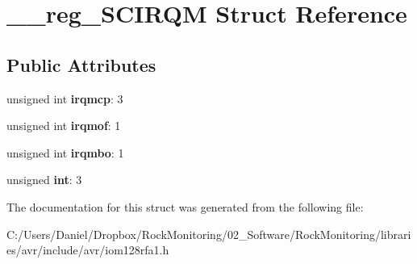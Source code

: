 \hypertarget{struct____reg___s_c_i_r_q_m}{}\section{\+\_\+\+\_\+reg\+\_\+\+S\+C\+I\+R\+QM Struct Reference}
\label{struct____reg___s_c_i_r_q_m}
\subsection*{Public Attributes}
\begin{DoxyCompactItemize}
\item 
unsigned int {\bfseries irqmcp}\+: 3\hypertarget{struct____reg___s_c_i_r_q_m_aca69c7a30afd0edab140d50f1ce9523c}{}\label{struct____reg___s_c_i_r_q_m_aca69c7a30afd0edab140d50f1ce9523c}

\item 
unsigned int {\bfseries irqmof}\+: 1\hypertarget{struct____reg___s_c_i_r_q_m_a069ed6155131d29311fc6e8fdd8c65c2}{}\label{struct____reg___s_c_i_r_q_m_a069ed6155131d29311fc6e8fdd8c65c2}

\item 
unsigned int {\bfseries irqmbo}\+: 1\hypertarget{struct____reg___s_c_i_r_q_m_a2a5025d5329f099558086e00a14a1e45}{}\label{struct____reg___s_c_i_r_q_m_a2a5025d5329f099558086e00a14a1e45}

\item 
unsigned {\bfseries int}\+: 3\hypertarget{struct____reg___s_c_i_r_q_m_a6e6bfa2dfa63f125b827894487a6f823}{}\label{struct____reg___s_c_i_r_q_m_a6e6bfa2dfa63f125b827894487a6f823}

\end{DoxyCompactItemize}


The documentation for this struct was generated from the following file\+:\begin{DoxyCompactItemize}
\item 
C\+:/\+Users/\+Daniel/\+Dropbox/\+Rock\+Monitoring/02\+\_\+\+Software/\+Rock\+Monitoring/libraries/avr/include/avr/iom128rfa1.\+h\end{DoxyCompactItemize}
